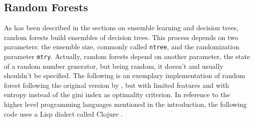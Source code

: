 \documentclass[a4paper,man,12pt,apacite,floatsintext,draftfirst]{apa6} %
\begin{document}
\subsection{Random Forests}
As has been described in the sections on ensemble learning and decision trees,
random forests build ensembles of decision trees.
This process depends on two parameters: the ensemble size, commonly called
\texttt{ntree}, and the randomization parameter \texttt{mtry}.
Actually, random forests depend on another parameter,
the state of a random number generator, but being random,
it doesn't and usually shouldn't be specified.
The following is an exemplary implementation of random forest following the
original version by \cite{breiman2001random}, but with limited features and
with entropy instead of the gini index as optimality criterion.
In reference to the higher level programming languages mentioned
in the introduction, the following code uses a Lisp
dialect called Clojure \cite{wpCLOJURE}.
\end{document}
